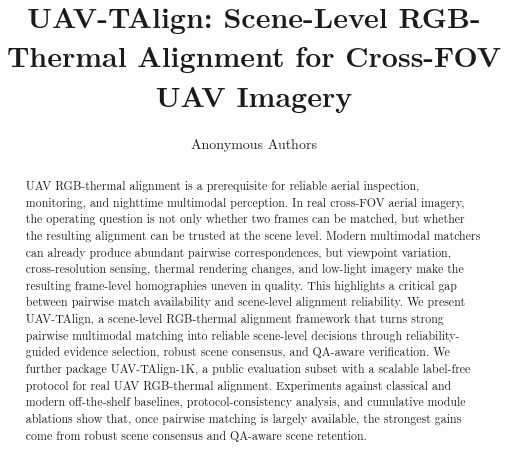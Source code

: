 \documentclass[runningheads]{LaTeX2e_Proceedings_Templates/llncs}
\begin{document}
\title{UAV-TAlign: Scene-Level RGB-Thermal Alignment for Cross-FOV UAV Imagery}

\author{Anonymous Authors}


\maketitle

\begin{abstract}
UAV RGB-thermal alignment is a prerequisite for reliable aerial inspection, monitoring, and
nighttime multimodal perception. In real cross-FOV aerial imagery, the operating question is not
only whether two frames can be matched, but whether the resulting alignment can be trusted at the
scene level. Modern multimodal matchers can already produce abundant pairwise correspondences, but
viewpoint variation, cross-resolution sensing, thermal rendering changes, and low-light imagery
make the resulting frame-level homographies uneven in quality. This highlights a critical gap
between pairwise match availability and scene-level alignment reliability. We present
UAV-TAlign, a scene-level RGB-thermal alignment framework that turns strong pairwise multimodal
matching into reliable scene-level decisions through reliability-guided evidence selection, robust
scene consensus, and QA-aware verification. We further package UAV-TAlign-1K, a public
evaluation subset with a scalable label-free protocol for real UAV RGB-thermal alignment.
Experiments against classical and modern off-the-shelf baselines, protocol-consistency analysis,
and cumulative module ablations show that, once pairwise matching is largely available, the
strongest gains come from robust scene consensus and QA-aware scene retention.

\end{abstract}












\end{document}
